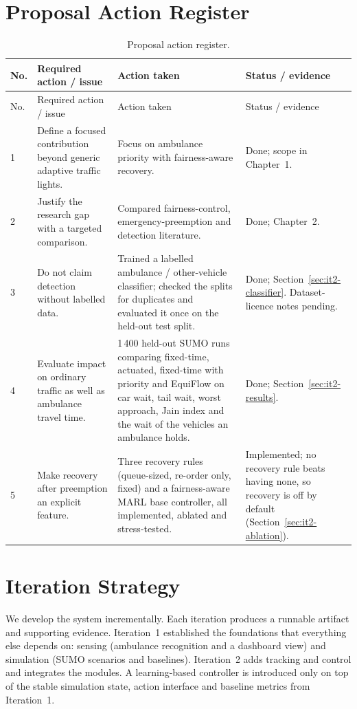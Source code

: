 \section{Proposal Action Register}
\begin{longtable}{p{}p{}p{}p{}}
\caption{Proposal action register.}\label{tab:action-register}\\
\toprule
No. & Required action / issue & Action taken & Status / evidence\\
\midrule
\endfirsthead
\toprule
No. & Required action / issue & Action taken & Status / evidence\\
\midrule
\endhead
1 & Define a focused contribution beyond generic adaptive traffic lights. &
Focus on ambulance priority with fairness-aware recovery. & Done; scope in Chapter~1.\\
2 & Justify the research gap with a targeted comparison. &
Compared fairness-control, emergency-preemption and detection literature. & Done; Chapter~2.\\
3 & Do not claim detection without labelled data. &
Trained a labelled ambulance / other-vehicle classifier; checked the splits for duplicates and evaluated it
once on the held-out test split. & Done; Section~\ref{sec:it2-classifier}. Dataset-licence notes pending.\\
4 & Evaluate impact on ordinary traffic as well as ambulance travel time. &
1\,400 held-out SUMO runs comparing fixed-time, actuated, fixed-time with priority and EquiFlow on car wait,
tail wait, worst approach, Jain index and the wait of the vehicles an ambulance holds. & Done;
Section~\ref{sec:it2-results}.\\
5 & Make recovery after preemption an explicit feature. &
Three recovery rules (queue-sized, re-order only, fixed) and a fairness-aware MARL base controller, all
implemented, ablated and stress-tested. & Implemented; no recovery rule beats having none, so recovery is off by
default (Section~\ref{sec:it2-ablation}).\\
\bottomrule
\end{longtable}

\section{Iteration Strategy}
We develop the system incrementally. Each iteration produces a runnable artifact and supporting evidence.
Iteration~1 established the foundations that everything else depends on: sensing (ambulance recognition and a
dashboard view) and simulation (SUMO scenarios and baselines). Iteration~2 adds tracking and control and
integrates the modules. A learning-based controller is introduced only on top of the stable simulation state,
action interface and baseline metrics from Iteration~1.

